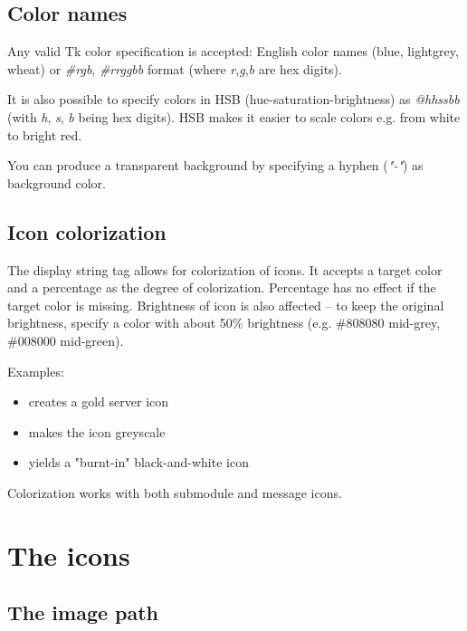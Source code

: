 \subsection{Color names}

Any valid Tk color specification is accepted: English color names
(blue, lightgrey, wheat) or \textit{\#rgb}, \textit{\#rrggbb} format
(where \textit{r},\textit{g},\textit{b} are hex digits).

It is also possible to specify colors in HSB (hue-saturation-brightness) as
\textit{@hhssbb} (with \textit{h}, \textit{s}, \textit{b} being hex digits).
HSB makes it easier to scale colors e.g. from white to bright red.

You can produce a transparent background by specifying a hyphen (\textit{"-"})
as background color.


\subsection{Icon colorization}

The  display string tag allows for colorization of icons.
It accepts a target color and a percentage as the degree of colorization.
Percentage has no effect if the target color is missing.
Brightness of icon is also affected -- to keep the original brightness,
specify a color with about 50\% brightness (e.g. \#808080 mid-grey,
\#008000 mid-green).

Examples:

\begin{itemize}
  \item {} creates a gold server icon
  \item {} makes the icon greyscale
  \item {} yields a "burnt-in" black-and-white icon
\end{itemize}

Colorization works with both submodule and message icons.


\section{The icons}
\label{sec:ch-graphics:icon-library}

\subsection{The image path}

